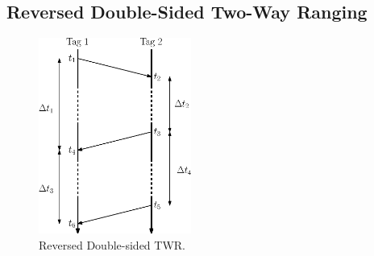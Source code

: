 \documentclass{decar-wsd}    %
\begin{document}
\subsection{Reversed Double-Sided Two-Way Ranging}

\begin{figure}
    \centering
    \includegraphics[width=5cm]{figs/multiplicative_twr.eps}
    \caption{Reversed Double-sided TWR.}
    \label{fig:rev_ds_twr}
\end{figure}
\end{document}
